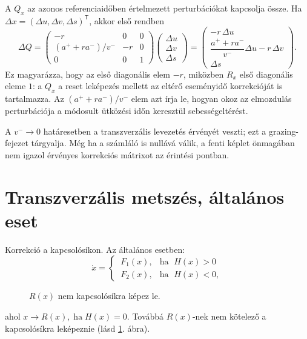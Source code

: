 A $Q_x$ az azonos referenciaidőben értelmezett perturbációkat kapcsolja össze. Ha $\Delta x=(\Delta u,\Delta v,\Delta s)^{\mathsf T}$, akkor első rendben
\[
\Delta Q=
\begin{pmatrix}-r&0&0\\(a^++ra^-)/v^-&-r&0\\0&0&1\end{pmatrix}
\begin{pmatrix}\Delta u\\\Delta v\\\Delta s\end{pmatrix}
=\begin{pmatrix}
-r\,\Delta u\\
\dfrac{a^++ra^-}{v^-}\Delta u-r\,\Delta v\\
\Delta s
\end{pmatrix}.
\]
Ez magyarázza, hogy az első diagonális elem $-r$, miközben $R_x$ első diagonális eleme $1$: a $Q_x$ a reset leképezés mellett az eltérő eseményidő korrekcióját is tartalmazza. Az $(a^++ra^-)/v^-$ elem azt írja le, hogyan okoz az elmozdulás perturbációja a módosult ütközési időn keresztül sebességeltérést.

A $v^-\to0$ határesetben a transzverzális levezetés érvényét veszti; ezt a grazing-fejezet tárgyalja. Még ha a számláló is nullává válik, a fenti képlet önmagában nem igazol érvényes korrekciós mátrixot az érintési pontban.
\exampleend

\section{Transzverzális metszés, általános eset}\label{sec:altalanos_korrekcio}

Korrekció a kapcsolósíkon. Az általános esetben:
\[
{\dot{x}} = \begin{cases}
   {\ F}_1(x), & \text{ha } \; H({ x})>0 \\
   {\ F}_2(x), & \text{ha } \; H({ x})<0,
 \end{cases}
\]

\begin{figure}
	\centering
	
	\caption{$R(x)$ nem kapcsolósíkra képez le.}\label{fig:501}
\end{figure}

ahol ${x}\rightarrow R({x}),\; \text{ha}\; H(x)=0.$ Továbbá $R(x)$-nek nem kötelező a kapcsolósíkra leképeznie (lásd \ref{fig:501}. ábra).\\

